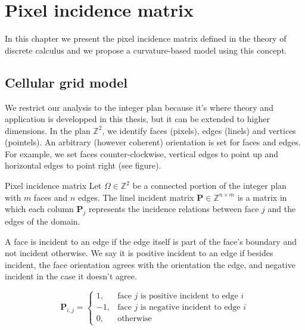 \chapter{Pixel incidence matrix}
\label{app:pixel-incidence-matrix}

In this chapter we present the pixel incidence matrix defined in the theory of discrete calculus and we propose a curvature-based model using this concept.

\section{Cellular grid model}

We restrict our analysis to the integer plan because it's where theory and application is developped in this thesis, but it can be extended to higher dimensions. In the plan $\mathbb{Z}^2$, we identify faces (pixels), edges (linels) and vertices (pointels). An arbitrary (however coherent) orientation is set for faces and edges. For example, we set faces counter-clockwise, vertical edges to point up and horizontal edges to point right (see figure).

\begin{definition}{Pixel incidence matrix}
	Let $\Omega \in \mathbb{Z}^2$ be a connected portion of the integer plan with $m$ faces and $n$ edges. The linel incident matrix $\mathbf{P} \in \mathbb{Z}^{n \times m}$ is a matrix in which each column $\mathbf{P} _j$ represents the incidence relations between face $j$ and the edges of the domain.
\end{definition}

A face is incident to an edge if the edge itself is part of the face's boundary and not incident otherwise. We say it is positive incident to an edge if besides incident, the face orientation  agrees with the orientation the edge, and negative incident in the case it doesn't agree.

\[
\mathbf{P} _{i,j} = \left\{ \begin{array}{ll}
	1, & \text{face $j$ is positive incident to edge $i$}\\
	-1, & \text{face $j$ is negative incident to edge $i$}\\	
	0, & \text{otherwise}
\end{array}\right.
\]


